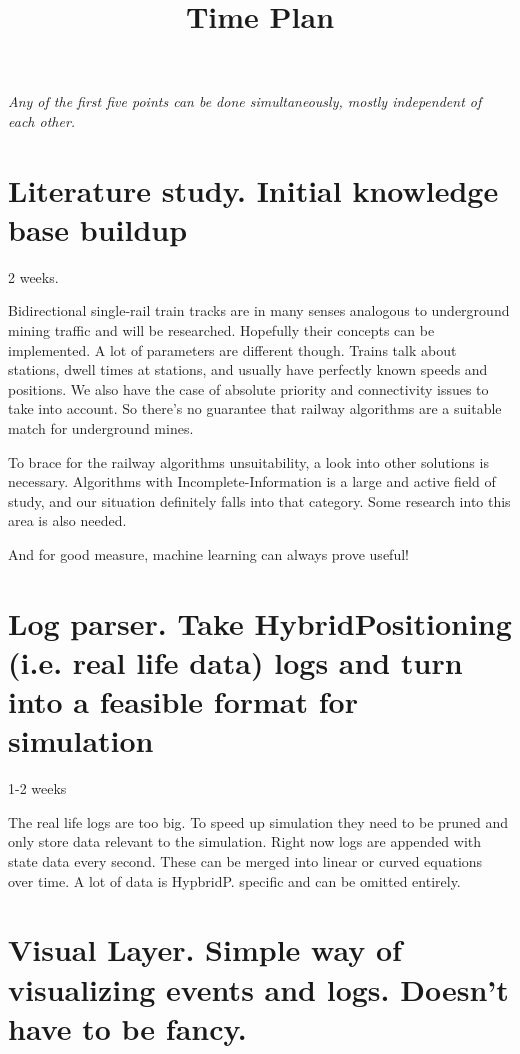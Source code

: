 \documentclass{article}
\title{\vspace{-3cm}Time Plan}
\begin{document}
    
    \maketitle
    
    \textit{Any of the first five points can be done simultaneously, mostly independent of each other.}
    
    \section{Literature study. Initial knowledge base buildup}
    
    2 weeks.
    
    Bidirectional single-rail train tracks are in many senses analogous to underground mining traffic and will be researched. Hopefully their concepts can be implemented. A lot of parameters are different though. Trains talk about stations, dwell times at stations, and usually have perfectly known speeds and positions. We also have the case of absolute priority and connectivity issues to take into account. So there's no guarantee that railway algorithms are a suitable match for underground mines.
    
    To brace for the railway algorithms unsuitability, a look into other solutions is necessary. Algorithms with Incomplete-Information is a large and active field of study, and our situation definitely falls into that category. Some research into this area is also needed. 
    
    And for good measure, machine learning can always prove useful!
    
    \section{Log parser. Take HybridPositioning (i.e. real life data) logs and turn into a feasible format for simulation}
    
    1-2 weeks
    
    The real life logs are too big. To speed up simulation they need to be pruned and only store data relevant to the simulation. Right now logs are appended with state data every second. These can be merged into linear or curved equations over time. A lot of data is HypbridP. specific and can be omitted entirely.
    
    \section{Visual Layer. Simple way of visualizing events and logs. Doesn't have to be fancy. }
    
\end{document}
